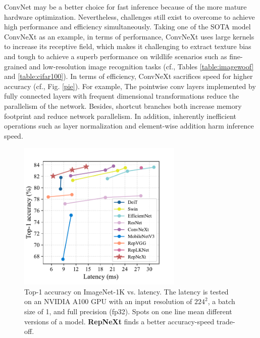 \documentclass[preprint,12pt]{elsarticle}
\begin{document}
ConvNet may be a better choice for fast inference because of the more mature hardware optimization. Nevertheless, challenges still exist to overcome to achieve high performance and efficiency simultaneously. Taking one of the SOTA model ConvNeXt \cite{convnext} as an example, in terms of performance, ConvNeXt uses large kernels to increase its receptive field, which makes it challenging to extract texture bias and tough to achieve a superb performance on wildlife scenarios such as fine-grained and low-resolution image recognition tasks (cf., Tables \ref{table:imagewoof} and \ref{table:cifar100}). In terms of efficiency, ConvNeXt sacrifices speed for higher accuracy (cf., Fig. \ref{pie}). For example, The pointwise conv layers implemented by fully connected layers with frequent dimensional transformations reduce the parallelism of the network. Besides, shortcut branches both increase memory footprint and reduce network parallelism. In addition, inherently inefficient operations such as layer normalization and element-wise addition harm inference speed.

\begin{figure}
  \centering
  \includegraphics[width=0.7\textwidth]{figs/fig1.pdf}
  \caption{Top-1 accuracy on ImageNet-1K vs. latency. The latency is tested on an NVIDIA A100 GPU with an input resolution of $224^2$, a batch size of 1, and full precision (fp32). Spots on one line mean different versions of a model. \textbf{RepNeXt} finds a better accuracy-speed trade-off.}
  \label{fig:top}
\end{figure}
\end{document}

